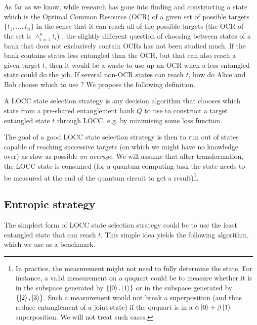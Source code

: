 As far as we know, while research has gone into finding and constructing a state which is the Optimal Common Resource (OCR) of a given set of possible targets $\{t_1, \dots, t_n\}$ in the sense that it can reach all of the possible targets (the OCR of the set is $\wedge_{i=1}^n t_i$) \cite{bosyk_optimal_2019, deside_probabilistic_2024}, the slightly different question of choosing between states of a bank that does not exclusively contain OCRs has not been studied much. If the bank contains states less entangled than the OCR, but that can also reach a given target $t$, then it would be a waste to use up an OCR when a less entangled state could do the job. If several non-OCR states can reach $t$, how do Alice and Bob choose which to use ? We propose the following definition.

\begin{definition}
    A LOCC state selection strategy is any decision algorithm that chooses which state from a pre-shared entanglement bank $Q$ to use to construct a target entangled state $t$ through LOCC, e.g. by minimising some loss function.
\end{definition}

The goal of a good LOCC state selection strategy is then to run out of states capable of reaching successive targets (on which we might have no knowledge over) as slow as possible \textit{on average}. We will assume that after transformation, the LOCC state is consumed (for a quantum computing task the state needs to be measured at the end of the quantum circuit to get a result)\footnote{In practice, the measurement might not need to fully determine the state. For instance, a valid measurement on a ququart could be to measure whether it is in the subspace generated by $\{\ket{0}, \ket{1}\}$ or in the subspace generated by $\{\ket{2}, \ket{3}\}$. Such a measurement would not break a superposition (and thus reduce entanglement of a joint state) if the ququart is in a $\alpha\ket{0} + \beta\ket{1}$ superposition. We will not treat such cases.}.



\subsection{Entropic strategy}

The simplest form of LOCC state selection strategy could be to use the least entangled state that can reach $t$. This simple idea yields the following algorithm, which we use as a benchmark.

